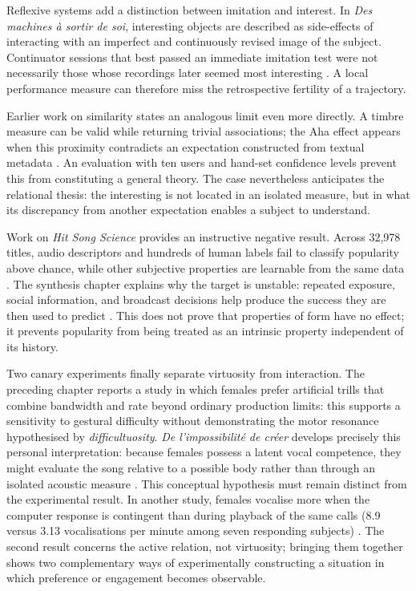 \documentclass[11pt,a4paper]{article}
\begin{document}
Reflexive systems add a distinction between imitation and interest. In
\emph{Des machines à sortir de soi}, interesting objects are described as
side-effects of interacting with an imperfect and continuously revised image of
the subject. Continuator sessions that best passed an immediate imitation test
were not necessarily those whose recordings later seemed most interesting
\parencite{pachet2008machines}. A local performance measure can therefore miss
the retrospective fertility of a trajectory.

Earlier work on similarity states an analogous limit even more directly. A
timbre measure can be valid while returning trivial associations; the Aha effect
appears when this proximity contradicts an expectation constructed from textual
metadata \parencite{aucouturier2002similarity}. An evaluation with ten users and
hand-set confidence levels prevent this from constituting a general theory. The
case nevertheless anticipates the relational thesis: the interesting is not
located in an isolated measure, but in what its discrepancy from another
expectation enables a subject to understand.

Work on \emph{Hit Song Science} provides an instructive negative result. Across
32,978 titles, audio descriptors and hundreds of human labels fail to classify
popularity above chance, while other subjective properties are learnable from
the same data \parencite{pachetroy2008hitsong}. The synthesis chapter explains
why the target is unstable: repeated exposure, social information, and broadcast
decisions help produce the success they are then used to predict
\parencite{pachet2011hitsong}. This does not prove that properties of form have
no effect; it prevents popularity from being treated as an intrinsic property
independent of its history.

Two canary experiments finally separate virtuosity from interaction. The
preceding chapter reports a study in which females prefer artificial trills that
combine bandwidth and rate beyond ordinary production limits: this supports a
sensitivity to gestural difficulty without demonstrating the motor resonance
hypothesised by \emph{difficultuosity}. \emph{De l'impossibilité de créer}
develops precisely this personal interpretation: because females possess a latent
vocal competence, they might evaluate the song relative to a possible body rather
than through an isolated acoustic measure \parencite{pachet2026impossibilite}.
This conceptual hypothesis must remain distinct from the experimental result. In
another study, females vocalise more
when the computer response is contingent than during playback of the same calls
(8.9 versus 3.13 vocalisations per minute among seven responding subjects)
\parencite{pachet2011hitsong,lerch2011closedloop}. The second result concerns the
active relation, not virtuosity; bringing them together shows two complementary
ways of experimentally constructing a situation in which preference or
engagement becomes observable.
\end{document}
